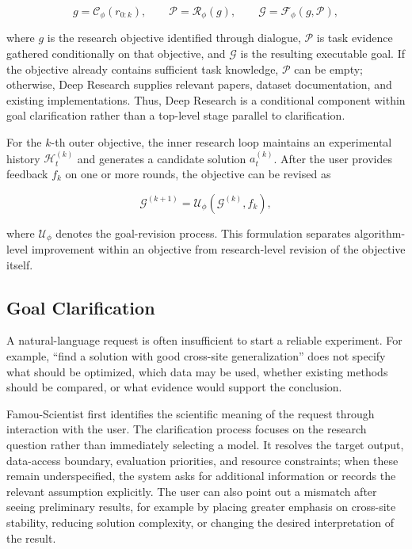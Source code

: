 \begin{equation}
\label{eq:goal_construction}
g=\mathcal{C}_{\phi}(r_{0:k}),\qquad
\mathcal{P}=\mathcal{R}_{\phi}(g),\qquad
\mathcal{G}=\mathcal{F}_{\phi}(g,\mathcal{P}),
\end{equation}

where $g$ is the research objective identified through dialogue, $\mathcal{P}$ is task evidence gathered conditionally on that objective, and $\mathcal{G}$ is the resulting executable goal. If the objective already contains sufficient task knowledge, $\mathcal{P}$ can be empty; otherwise, Deep Research supplies relevant papers, dataset documentation, and existing implementations. Thus, Deep Research is a conditional component within goal clarification rather than a top-level stage parallel to clarification.

For the $k$-th outer objective, the inner research loop maintains an experimental history $\mathcal{H}^{(k)}_t$ and generates a candidate solution $a^{(k)}_t$. After the user provides feedback $f_k$ on one or more rounds, the objective can be revised as

\begin{equation}
\label{eq:goal_update}
\mathcal{G}^{(k+1)}=\mathcal{U}_{\phi}(\mathcal{G}^{(k)},f_k),
\end{equation}

where $\mathcal{U}_{\phi}$ denotes the goal-revision process. This formulation separates algorithm-level improvement within an objective from research-level revision of the objective itself.

\subsection{Goal Clarification}
\label{sec:agent_clarification}

A natural-language request is often insufficient to start a reliable experiment. For example, ``find a solution with good cross-site generalization'' does not specify what should be optimized, which data may be used, whether existing methods should be compared, or what evidence would support the conclusion.

Famou-Scientist first identifies the scientific meaning of the request through interaction with the user. The clarification process focuses on the research question rather than immediately selecting a model. It resolves the target output, data-access boundary, evaluation priorities, and resource constraints; when these remain underspecified, the system asks for additional information or records the relevant assumption explicitly. The user can also point out a mismatch after seeing preliminary results, for example by placing greater emphasis on cross-site stability, reducing solution complexity, or changing the desired interpretation of the result.

